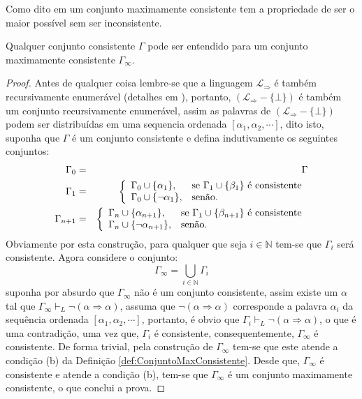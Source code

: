Como dito em \cite{joaoPavao2014} um conjunto maximamente consistente tem a propriedade de ser o maior possível sem ser inconsistente. 

\begin{theorem}\label{teo:ExtensaomaximamenteConsistente}
    Qualquer conjunto consistente $\Gamma$ pode ser entendido para um conjunto maximamente consistente $\Gamma_\infty$.
\end{theorem}

\begin{proof}
    Antes de qualquer coisa lembre-se que a linguagem $\mathcal{L}_{\Rightarrow}$ é também recursivamente enumerável (detalhes em \cite{ullman1992}), portanto, $(\mathcal{L}_{\Rightarrow} - \{\bot\})$ é também um conjunto recursivamente enumerável, assim as palavras de $(\mathcal{L}_{\Rightarrow} - \{\bot\})$ podem ser distribuídas em uma sequencia ordenada $[\alpha_1, \alpha_2, \cdots]$, dito isto, suponha que $\Gamma$ é um conjunto consistente e defina indutivamente os seguintes conjuntos:
    \begin{eqnarray*}
        \Gamma_0 & = & \Gamma\\
        \Gamma_1 & = & \left\{\begin{array}{ll}	\Gamma_0 \cup \{\alpha_1\}, & \hbox{se } \Gamma_1 \cup \{\beta_1\} \hbox{ é consistente}\\ \Gamma_0 \cup \{\neg \alpha_1\},  & \hbox{senão.}\end{array}\right.\\
        \Gamma_{n+1} & = & \left\{\begin{array}{ll}	\Gamma_n \cup \{\alpha_{n+1}\}, & \hbox{se } \Gamma_1 \cup \{\beta_{n+1}\} \hbox{ é consistente}\\ \Gamma_n \cup \{\neg \alpha_{n+1}\},  & \hbox{senão.}\end{array}\right.
    \end{eqnarray*}
    Obviamente por esta construção, para qualquer que seja $i \in \mathbb{N}$ tem-se que $\Gamma_i$ será consistente. Agora considere o conjunto:
    $$\Gamma_\infty = \bigcup_{i \in \mathbb{N}} \Gamma_i$$
    suponha por absurdo que $\Gamma_\infty$ não é um conjunto consistente,  assim existe um $\alpha$ tal que   $\Gamma_\infty \vdash_L \neg (\alpha \Rightarrow \alpha)$, assuma que $\neg (\alpha \Rightarrow \alpha)$ corresponde a palavra $\alpha_i$ da sequência ordenada $[\alpha_1, \alpha_2, \cdots]$, portanto, é obvio que $\Gamma_i \vdash_L \neg (\alpha \Rightarrow \alpha)$, o que é uma contradição, uma vez que, $\Gamma_i$ é consistente, consequentemente, $\Gamma_\infty$ é consistente. De forma trivial, pela construção de $\Gamma_\infty$ tem-se que este atende a condição (b) da Definição \ref{def:ConjuntoMaxConsistente}. Desde que, $\Gamma_\infty$ é consistente e atende a condição (b), tem-se que $\Gamma_\infty$ é um conjunto maximamente consistente, o que conclui a prova.
\end{proof}

